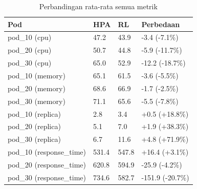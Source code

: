 \begin{table}[ht]
  \centering
  \caption{Perbandingan rata-rata semua metrik}\label{tab:deskriptif-all-metrics}
  \begin{tabular}{llll}
    \toprule
    Pod & HPA & RL & Perbedaan \\
    \midrule
    pod\_10 (cpu) & 47.2 & 43.9 & -3.4 (-7.1\%) \\
    pod\_20 (cpu) & 50.7 & 44.8 & -5.9 (-11.7\%) \\
    pod\_30 (cpu) & 65.0 & 52.9 & -12.2 (-18.7\%) \\
    pod\_10 (memory) & 65.1 & 61.5 & -3.6 (-5.5\%) \\
    pod\_20 (memory) & 68.6 & 66.9 & -1.7 (-2.5\%) \\
    pod\_30 (memory) & 71.1 & 65.6 & -5.5 (-7.8\%) \\
    pod\_10 (replica) & 2.8 & 3.4 & +0.5 (+18.8\%) \\
    pod\_20 (replica) & 5.1 & 7.0 & +1.9 (+38.3\%) \\
    pod\_30 (replica) & 6.7 & 11.6 & +4.8 (+71.9\%) \\
    pod\_10 (response\_time) & 531.4 & 547.8 & +16.4 (+3.1\%) \\
    pod\_20 (response\_time) & 620.8 & 594.9 & -25.9 (-4.2\%) \\
    pod\_30 (response\_time) & 734.6 & 582.7 & -151.9 (-20.7\%) \\
    \bottomrule
  \end{tabular}
\end{table}